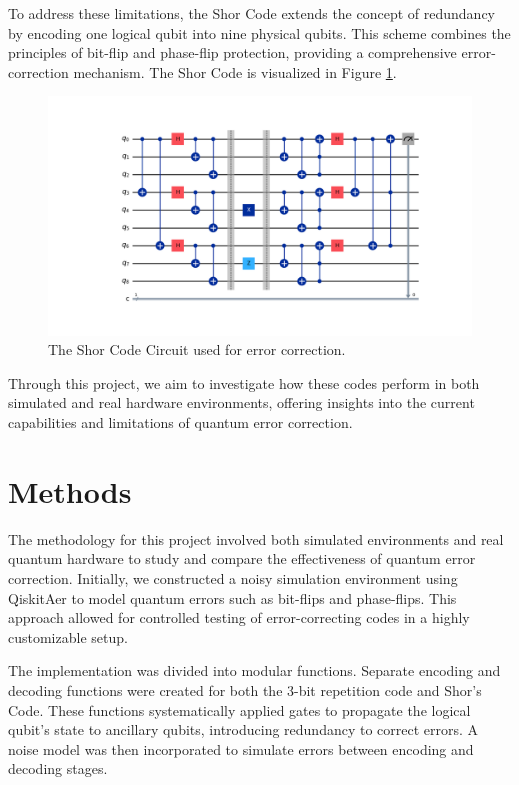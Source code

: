 \documentclass[10pt]{article}
\begin{document}
\begin{multicols}{2}
    To address these limitations, the Shor Code extends the concept of redundancy by encoding one logical qubit into nine physical qubits. This scheme combines the principles of bit-flip and phase-flip protection, providing a comprehensive error-correction mechanism.\cite{roffe} The Shor Code is visualized in Figure \ref{fig:shor_circuit}.
    \begin{figure}[H]
        \centering
        \includegraphics[width=1.0\columnwidth]{figures/shor.png}
        \caption{The Shor Code Circuit used for error correction.}
        \label{fig:shor_circuit}
    \end{figure}
    
    Through this project, we aim to investigate how these codes perform in both simulated and real hardware environments, offering insights into the current capabilities and limitations of quantum error correction.

\section*{Methods}
The methodology for this project involved both simulated environments and real quantum hardware to study and compare the effectiveness of quantum error correction. Initially, we constructed a noisy simulation environment using QiskitAer to model quantum errors such as bit-flips and phase-flips. This approach allowed for controlled testing of error-correcting codes in a highly customizable setup.

The implementation was divided into modular functions. Separate encoding and decoding functions were created for both the 3-bit repetition code and Shor's Code. These functions systematically applied gates to propagate the logical qubit's state to ancillary qubits, introducing redundancy to correct errors. A noise model was then incorporated to simulate errors between encoding and decoding stages.


\end{multicols}
\end{document}

